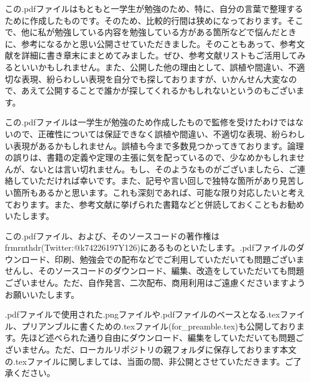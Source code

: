 \documentclass[a4paper]{jsarticle}
\begin{document}
この.pdfファイルはもともと一学生が勉強のため、特に、自分の言葉で整理するために作成したものです。そのため、比較的行間は狭めになっております。そこで、他に私が勉強している内容を勉強している方がある箇所などで悩んだときに、参考になるかと思い公開させていただきました。そのこともあって、参考文献を詳細に書き章末にまとめてみました。ぜひ、参考文献リストもご活用してみるといいかもしれません。また、公開した他の理由として、誤植や間違い、不適切な表現、紛らわしい表現を自分でも探しておりますが、いかんせん大変なので、あえて公開することで誰かが探してくれるかもしれないというのもございます。\par
この.pdfファイルは一学生が勉強のため作成したもので監修を受けたわけではないので、正確性については保証できなく誤植や間違い、不適切な表現、紛らわしい表現があるかもしれません。誤植も今まで多数見つかってきております。論理の誤りは、書籍の定義や定理の主張に気を配っているので、少なめかもしれませんが、ないとは言い切れません。もし、そのようなものがございましたら、ご連絡していただければ幸いです。また、記号や言い回しで独特な箇所があり見苦しい箇所もあるかと思います。これも深刻であれば、可能な限り対応したいと考えております。また、参考文献に挙げられた書籍などと併読しておくこともお勧めいたします。\par
この.pdfファイル、および、そのソースコードの著作権はfrmrnthdr(Twitter:@k74226197Y126)にあるものといたします。.pdfファイルのダウンロード、印刷、勉強会での配布などでご利用していただいても問題ございませんし、そのソースコードのダウンロード、編集、改造をしていただいても問題ございません。ただ、自作発言、二次配布、商用利用はご遠慮くださいますようお願いいたします。\par
.pdfファイルで使用された.pngファイルや.pdfファイルのベースとなる.texファイル、プリアンブルに書くための.texファイル(for\_preamble.tex)も公開しております。先ほど述べられた通り自由にダウンロード、編集をしていただいても問題ございません。ただ、ローカルリポジトリの親フォルダに保存しております本文の.texファイルに関しましては、当面の間、非公開とさせていただきます。ご了承ください。
\end{document}
